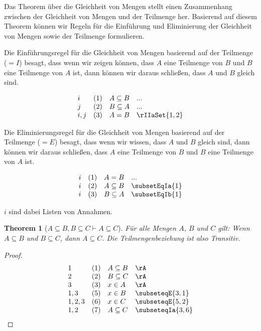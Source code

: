 \documentclass{book}
\theoremstyle{plain}
\newtheorem{theorem}{Theorem}
\theoremstyle{remark}
\theoremstyle{definition}
\begin{document}
Das Theorem über die Gleichheit von Mengen stellt einen Zusammenhang zwischen der Gleichheit von Mengen und der Teilmenge her. Basierend auf diesem Theorem können wir Regeln für die Einführung und Eliminierung der Gleichheit von Mengen sowie der Teilmenge formulieren.

Die Einführungsregel für die Gleichheit von Mengen basierend auf der Teilmenge (\(= I\)) besagt, dass wenn wir zeigen können, dass \(A\) eine Teilmenge von \(B\) und \(B\) eine Teilmenge von \(A\) ist, dann können wir daraus schließen, dass \(A\) und \(B\) gleich sind.

\[
\begin{array}{llll}
	i & (1) & A \subseteq B & ... \\
	j & (2) & B \subseteq A & ... \\
	i,j & (3) & A = B & \rIIaSet{1,2} \\
\end{array}
\]

Die Eliminierungsregel für die Gleichheit von Mengen basierend auf der Teilmenge (\(= E\)) besagt, dass wenn wir wissen, dass \(A\) und \(B\) gleich sind, dann können wir daraus schließen, dass \(A\) eine Teilmenge von \(B\) und \(B\) eine Teilmenge von \(A\) ist.

\[
\begin{array}{llll}
	i & (1) & A = B & ... \\
	i & (2) & A \subseteq B & \subsetEqIa{1} \\
	i & (3) & B \subseteq A & \subsetEqIb{1} \\
\end{array}
\]

\(i\) sind dabei Listen von Annahmen.

\label{ASubseteqBwBSubseteqCImpASubseteqC}
\begin{theorem}[\(A \subseteq B, B \subseteq C \vdash A \subseteq C\)]
	Für alle Mengen \(A\), \(B\) und \(C\) gilt: Wenn \(A \subseteq B\) und \(B \subseteq C\), dann \(A \subseteq C\). Die Teilmengenbeziehung ist also Transitiv.
\end{theorem}
\begin{proof}
	\[
	\begin{array}{llll}
		1 & (1) & A \subseteq B & \rA \\
		2 & (2) & B \subseteq C & \rA \\
		3 & (3) & x \in A & \rA \\
		1,3 & (5) & x \in B & \subseteqE{3,1} \\
		1,2,3 & (6) & x \in C & \subseteqE{5,2} \\
		1,2 & (7) & A\subseteq C & \subseteqIa{3,6} \\
	\end{array}
	\]
\end{proof}
\end{document}
